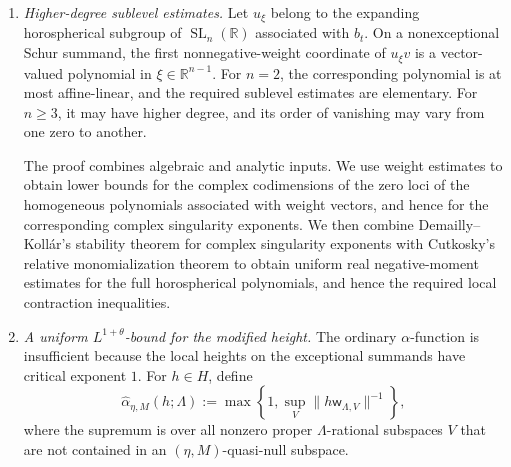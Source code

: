 \documentclass[reqno,11pt]{amsart}
\numberwithin{equation}{section}
\theoremstyle{definition}
\theoremstyle{remark}
\newcommand{\op}{\operatorname}
\newcommand{\br}{\mathbb R}
\newcommand{\SL}{\op{SL}}
\begin{document}
\begin{enumerate}[label=\textnormal{(\arabic*)}]

\item \emph{Higher-degree sublevel estimates.}
Let  $u_\xi$ belong to the expanding horospherical subgroup of $\SL_n(\br)$ associated with $b_t$.
On a nonexceptional Schur summand, the first nonnegative-weight coordinate
of $u_\xi v$ is a
vector-valued polynomial in $\xi\in\mathbb R^{n-1}$. For $n=2$,
the corresponding polynomial is at most affine-linear, and the required
sublevel estimates are elementary. For $n\ge3$, it may have higher degree,
and its order of vanishing may vary from one zero to another.

The proof combines algebraic
and analytic inputs. We use weight estimates to obtain lower bounds for the complex codimensions
of the zero loci of the homogeneous polynomials associated with weight
vectors, and hence for the corresponding complex singularity exponents. We then combine Demailly--Koll\'ar's stability theorem for complex
singularity exponents \cite{DemaillyKollar2001} with Cutkosky's relative
monomialization theorem \cite{Cutkosky2017} to obtain uniform real
negative-moment estimates for the full horospherical polynomials, and
hence the required local contraction inequalities.


\item \emph{A uniform $L^{1+\theta}$-bound for the modified height.} The ordinary $\alpha$-function is insufficient because the local
heights on the exceptional summands have critical exponent $1$. For $h\in H$,
define
$$
\widehat\alpha_{\eta,M}(h;\Lambda)
:=\max\left\{ 1, \sup_V\|h\mathsf w_{\Lambda,V}\|^{-1}
\right\},
$$
where the supremum is over all nonzero proper $\Lambda$-rational subspaces
$V$ that are not contained in an $(\eta,M)$-quasi-null subspace. 


\end{enumerate}
\end{document}
